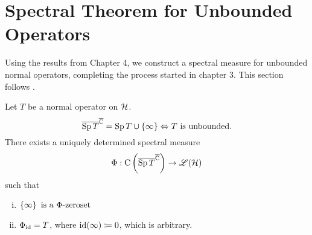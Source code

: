 \section{Spectral Theorem for Unbounded Operators}

Using the results from Chapter 4, we construct a spectral measure
for unbounded normal operators, completing the process started in chapter
3. This section follows \cite{LesHaupt}.
\begin{thrm}\label{USpectral}
 Let $T$ be a normal operator on $\mathcal{H}$.
 \[ 
 \overline{\operatorname{Sp} T}^{\overline{\mathbb{C}}} = \operatorname{Sp} T \cup \left\lbrace \infty \right\rbrace \Leftrightarrow T
 \text{ is unbounded.}
 \]
 There exists a uniquely determined spectral measure
 \[
  \Phi : \operatorname{C}\left( \overline{\operatorname{Sp} T }^{\overline{\mathbb{C}}} \right) \to \mathscr{L}(\mathcal{H})
 \]
 such that
 \begin{enumerate}[(i)]
  \item $
         \left\lbrace \infty \right\rbrace \text{ is a } \Phi\text{-zeroset}
        $
        
       
  \item $\Phi_{\operatorname{id}} = T$, where $\operatorname{id}(\infty) \coloneqq 0$, which is arbitrary.

  
 \end{enumerate}

\end{thrm}

